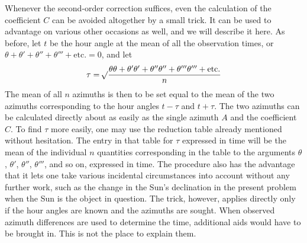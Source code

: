 Whenever the second-order correction suffices, even the calculation of the coefficient $C$ can be avoided altogether by a small trick. It can be used to advantage on various other occasions as well, and we will describe it here. As before, let $t$ be the hour angle at the mean of all the observation times, or $\theta+\theta'+\theta''+\theta'''+\text{etc.}=0$, and let
\[
\tau=\mathord{{}^{}\!\surd}\frac{\theta\theta+\theta'\theta'+\theta''\theta''+\theta'''\theta'''+\text{etc.}}{n}
\]
The mean of all $n$ azimuths is then to be set equal to the mean of the two azimuths corresponding to the hour angles $t-\tau$ and $t+\tau$. The two azimuths can be calculated directly about as easily as the single azimuth $A$ and the coefficient $C$. To find $\tau$ more easily, one may use the reduction table already mentioned without hesitation. The entry in that table for $\tau$ expressed in time will be the mean of the individual $n$ quantities corresponding in the table to the arguments $\theta$, $\theta'$, $\theta''$, $\theta'''$, and so on, expressed in time. The procedure also has the advantage that it lets one take various incidental circumstances into account without any further work, such as the change in the Sun's declination in the present problem when the Sun is the object in question. The trick, however, applies directly only if the hour angles are known and the azimuths are sought. When observed azimuth differences are used to determine the time, additional aids would have to be brought in. This is not the place to explain them.

